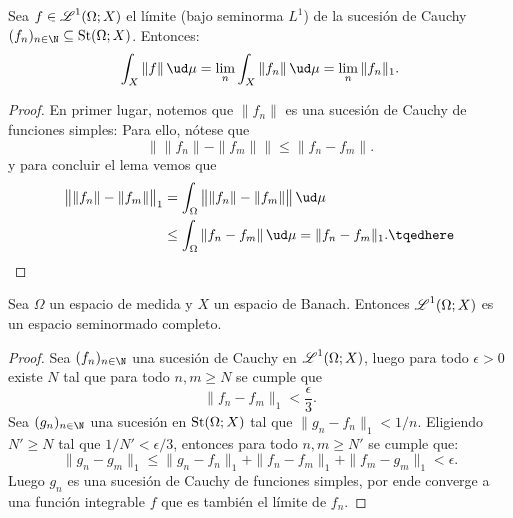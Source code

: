 \begin{lem}
	Sea $f \in \operatorname{\mathscr{L}}^1(\Omega; X)$ el límite (bajo seminorma $L^1$) de la sucesión de Cauchy $(f_n)_{n\in\N} \subseteq \St(\Omega; X)$.
	Entonces:
	$$ \int_X \|f\| \, \ud\mu = \lim_n \int_X \|f_n\| \, \ud\mu = \lim_n \|f_n\|_1. $$
\end{lem}
\begin{proof}
	En primer lugar, notemos que $\|f_n\|$ es una sucesión de Cauchy de funciones simples:
	Para ello, nótese que
	$$ \big\| \|f_n\| - \|f_m\| \big\| \le \|f_n - f_m\|. $$
	y para concluir el lema vemos que
	\begin{align*}
		\big\| \|f_n\| - \|f_m\| \big\|_1 &= \int_\Omega \big\| \|f_n\| - \|f_m\| \big\| \, \ud\mu \notag \\
		&\le \int_\Omega \|f_n - f_m\| \, \ud\mu = \|f_n - f_m\|_1. \tqedhere
	\end{align*}
\end{proof}

\begin{thmi}
	Sea $\Omega$ un espacio de medida y $X$ un espacio de Banach.
	Entonces $\operatorname{\mathscr{L}}^1(\Omega; X)$ es un espacio seminormado completo.
\end{thmi}
\begin{proof}
	Sea $(f_n)_{n\in\N}$ una sucesión de Cauchy en $\operatorname{\mathscr{L}}^1(\Omega; X)$, luego para todo $\epsilon > 0$
	existe $N$ tal que para todo $n, m\ge N$ se cumple que
	$$ \|f_n - f_m\|_1 < \frac{\epsilon}{3}. $$
	Sea $(g_n)_{n\in\N}$ una sucesión en $\operatorname{St}(\Omega; X)$ tal que $\|g_n - f_n\|_1 < 1/n$.
	Eligiendo $N' \ge N$ tal que $1/N' < \epsilon/3$, entonces para todo $n, m \ge N'$ se cumple que:
	$$ \|g_n - g_m\|_1 \le \|g_n - f_n\|_1 + \|f_n - f_m\|_1 + \|f_m - g_m\|_1 < \epsilon. $$
	Luego $g_n$ es una sucesión de Cauchy de funciones simples, por ende converge a una función integrable $f$ que es también
	el límite de $f_n$.
\end{proof}

